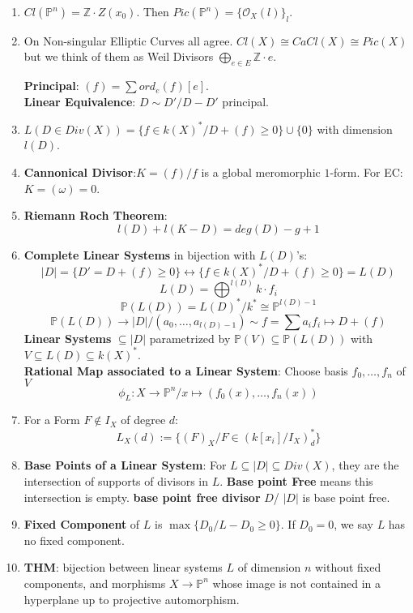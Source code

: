 \documentclass{article}
\newcommand{\Z}{\mathbb{Z}}
\newcommand{\PP}{\mathbb{P}}
\newcommand{\OO}{\mathcal{O}}
\newcommand{\ra}{\rightarrow}
\newcommand{\lra}{\leftrightarrow}
\begin{document}
\begin{multicols}{2}
\begin{enumerate}
\item $Cl(\PP^n) = \Z \cdot Z(x_0)$. Then $Pic(\PP^n) = \{\OO_X(l)\}_l$. 

\item On Non-singular Elliptic Curves all agree. $Cl(X) \cong CaCl(X) \cong Pic(X)$ but we think of them as Weil Divisors $\bigoplus_{e \in E} \Z\cdot e$. 

\textbf{Principal}: $(f) = \sum ord_e(f)[e]$.\\
\textbf{Linear Equivalence}: $D \sim D'/ D-D'$ principal.\\

\item $L(D \in Div(X)) = \{f \in k(X)^*/ D + (f) \geq 0\} \cup \{0\}$ with dimension $l(D)$.
\item \textbf{Cannonical Divisor}:$K = (f)/f$ is a global meromorphic $1$-form. For EC: $K = (\omega) = 0$. 
\item \textbf{Riemann Roch Theorem}:
\[l(D) + l(K-D) = deg(D) - g + 1\]

\item \textbf{Complete Linear Systems} in bijection with $L(D)$'s:
\[|D| = \{D' = D + (f) \geq 0\} \lra \{f \in k(X)^*/ D + (f) \geq 0\} = L(D)\]
\[L(D) = \bigoplus^{l(D)}k \cdot f_i\]
\[\PP(L(D)) = L(D)^*/k^* \cong \PP^{l(D) - 1}\]
\[\PP(L(D))  \ra |D|/(a_0,\ldots,a_{l(D)-1}) \sim f = \sum a_if_i \mapsto D + (f)\]
\textbf{Linear Systems} $\subseteq |D|$ parametrized by $\PP(V) \subseteq \PP(L(D))$ with $V \subseteq L(D) \subseteq k(X)^*$.\\
\textbf{Rational Map associated to a Linear System}: Choose basis $f_0, \ldots, f_n$ of $V$
\[\phi_L: X \ra \PP^n/x \mapsto (f_0(x),\ldots,f_n(x))\]

\item For a Form $F \notin I_X$ of degree $d$:
\[L_X(d):= \{(F)_X/ F \in (k[x_i]/I_X)^*_d  \}\]

\item \textbf{Base Points of a Linear System}: For $L \subseteq |D| \subseteq Div(X)$, they are the intersection of supports of divisors in $L$. \textbf{Base point Free} means this intersection is empty. \textbf{base point free divisor} $D$/ $|D|$ is base point free.

\item \textbf{Fixed Component} of $L$ is $\max\{D_0/ L - D_0 \geq 0\}$. If $D_0 = 0$, we say $L$ has no fixed component. 

\item \textbf{THM}: bijection between linear systems $L$ of dimension $n$ without fixed components, and morphisms $X \ra \PP^n$ whose image is not contained in a hyperplane up to projective automorphism. 



\end{enumerate}
\end{multicols}
\end{document}
